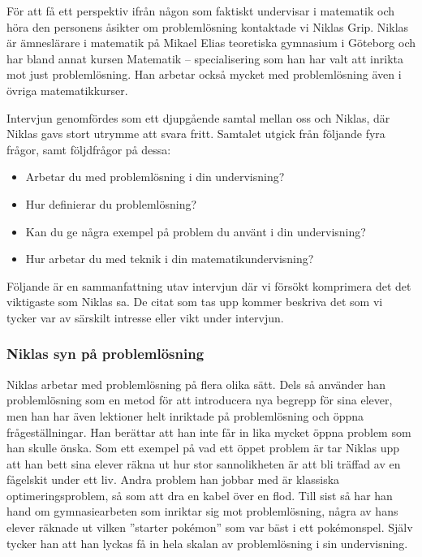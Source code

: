 \textcolor{turkos}{
För att få ett perspektiv ifrån någon som faktiskt undervisar i matematik och höra den personens åsikter om problemlösning kontaktade vi Niklas Grip. Niklas är ämneslärare i matematik på Mikael Elias teoretiska gymnasium i Göteborg och har bland annat kursen Matematik – specialisering som han har valt att inrikta mot just problemlösning. Han arbetar också mycket med problemlösning även i övriga matematikkurser.
}

\textcolor{turkos}{
Intervjun genomfördes som ett djupgående samtal mellan oss och Niklas, där Niklas gavs stort utrymme att svara fritt. Samtalet utgick från följande fyra frågor, samt följdfrågor på dessa: 
}
\begin{itemize}
  \item \textcolor{turkos}{Arbetar du med problemlösning i din undervisning?}
  \item \textcolor{turkos}{Hur definierar du problemlösning?}
  \item \textcolor{turkos}{Kan du ge några exempel på problem du använt i din undervisning?}
  \item \textcolor{turkos}{Hur arbetar du med teknik i din matematikundervisning?}
\end{itemize}

\noindent \textcolor{turkos}{
Följande är en sammanfattning utav intervjun där vi försökt komprimera det det viktigaste som Niklas sa. De citat som tas upp kommer beskriva det som vi tycker var av särskilt intresse eller vikt under intervjun. 
}

\subsubsection{Niklas syn på problemlösning}
\label{sec:Niklassyn}

\textcolor{turkos}{
Niklas arbetar med problemlösning på flera olika sätt. Dels så använder han problemlösning som en metod för att introducera nya begrepp för sina elever, men han har även lektioner helt inriktade på problemlösning och öppna frågeställningar. Han berättar att han inte får in lika mycket öppna problem som han skulle önska. Som ett exempel på vad ett öppet problem är tar Niklas upp att han bett sina elever räkna ut hur stor sannolikheten är att bli träffad av en fågelskit under ett liv. Andra problem han jobbar med är klassiska optimeringsproblem, så som att dra en kabel över en flod. Till sist så har han hand om gymnasiearbeten som inriktar sig mot problemlösning, några av hans elever räknade ut vilken ''starter pokémon'' som var bäst i ett pokémonspel. Själv tycker han att han lyckas få in hela skalan av problemlösning i sin undervisning.
}

